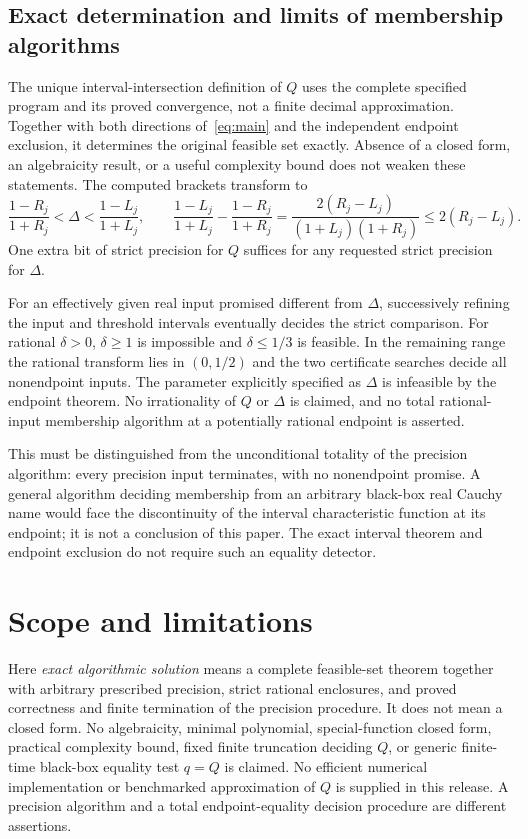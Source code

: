 \documentclass[11pt,a4paper]{article}
\theoremstyle{definition}\newtheorem{definition}[theorem]{Definition}
\theoremstyle{remark}\newtheorem{remark}[theorem]{Remark}
\begin{document}
\subsection{Exact determination and limits of membership algorithms}
The unique interval-intersection definition of $Q$ uses the complete
specified program and its proved convergence, not a finite decimal
approximation. Together with both directions of~\eqref{eq:main} and
the independent endpoint exclusion, it determines the original feasible
set exactly. Absence of a closed form, an algebraicity result, or a useful
complexity bound does not weaken these statements.
The computed brackets transform to
\[
 \frac{1-R_j}{1+R_j}<\Delta<\frac{1-L_j}{1+L_j},\qquad
 \frac{1-L_j}{1+L_j}-\frac{1-R_j}{1+R_j}
 =\frac{2(R_j-L_j)}{(1+L_j)(1+R_j)}\leq2(R_j-L_j).
\]
One extra bit of strict precision for $Q$ suffices for any requested
strict precision for $\Delta$.

For an effectively given real input promised different from $\Delta$,
successively refining the input and threshold intervals eventually
decides the strict comparison. For rational $\delta>0$, $\delta\geq1$
is impossible and $\delta\leq1/3$ is feasible. In the remaining range
the rational transform lies in $(0,1/2)$ and the two certificate searches
decide all nonendpoint inputs. The parameter explicitly specified as
$\Delta$ is infeasible by the endpoint theorem. No irrationality of
$Q$ or $\Delta$ is claimed, and no total rational-input membership
algorithm at a potentially rational endpoint is asserted.

This must be distinguished from the unconditional totality of the
precision algorithm: every precision input terminates, with no
nonendpoint promise. A general algorithm deciding membership from an
arbitrary black-box real Cauchy name would face the discontinuity of the
interval characteristic function at its endpoint; it is not a conclusion
of this paper. The exact interval theorem and endpoint exclusion do not
require such an equality detector.

\section{Scope and limitations}\label{sec:scope}
Here \emph{exact algorithmic solution} means a complete feasible-set theorem
together with arbitrary prescribed precision, strict rational enclosures,
and proved correctness and finite termination of the precision procedure.
It does not mean a closed form. No algebraicity, minimal polynomial,
special-function closed form, practical complexity bound, fixed finite
truncation deciding $Q$, or generic finite-time black-box equality test
$q=Q$ is claimed. No efficient numerical implementation or benchmarked
approximation of $Q$ is supplied in this release. A precision algorithm
and a total endpoint-equality decision procedure are different assertions.
\end{document}
